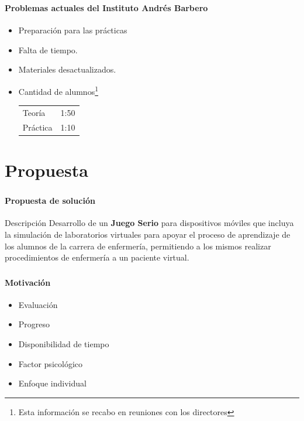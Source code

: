 \begin{frame}
\frametitle{\pagetitle}
\framesubtitle{Problemas actuales del Instituto Andrés Barbero}
\begin{itemize}[<+->]
\item Preparación para las prácticas
\item Falta de tiempo.
\item Materiales desactualizados.
\item Cantidad de alumnos\footnote{Esta información se recabo en reuniones con
        los directores}

    \bigskip

    \begin{tabular}{lr}
        \tabitem{} Teoría   & 1:50 \\
        \tabitem{} Práctica & 1:10 \\
    \end{tabular}
\end{itemize}
\end{frame}

\section{Propuesta}
\setcounter{sectiontotal}{5}

\begin{frame}
\frametitle{\pagetitle}
\framesubtitle{Propuesta de solución}
\begin{block}{Descripción}
\centering
Desarrollo de un \textbf{Juego Serio} para dispositivos móviles que incluya la
simulación de laboratorios virtuales para apoyar el proceso de aprendizaje de
los alumnos de la carrera de enfermería, permitiendo a los mismos realizar
procedimientos de enfermería a un paciente virtual.
\end{block}
\end{frame}

\begin{frame}
\frametitle{\pagetitle}
\framesubtitle{Motivación}

\begin{itemize}[<+->]
\item Evaluación
\item Progreso
\item Disponibilidad de tiempo
\item Factor psicológico
\item Enfoque individual
\end{itemize}
\end{frame}

